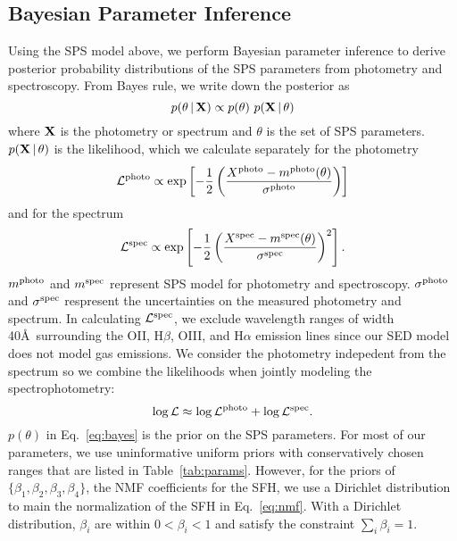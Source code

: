 \subsection{Bayesian Parameter Inference} \label{sec:infer} 
Using the SPS model above, we perform Bayesian parameter inference to derive
posterior probability distributions of the SPS parameters from photometry and
spectroscopy. 
From Bayes rule, we write down the posterior as
\begin{equation} \label{eq:bayes}
    p(\theta\given {\bf X}) \propto p(\theta)~p({\bf X} \given \theta)
\end{equation}
where ${\bf X}$ is the photometry or spectrum and $\theta$ is the set of SPS
parameters. 
$p({\bf X} \,|\, \theta)$ is the likelihood, which we calculate separately for
the photometry
\begin{equation}
    \mathcal{L}^{\rm photo} \propto \exp\left[-\frac{1}{2} \left(\frac{X^{\rm photo} -
    m^{\rm photo}(\theta)}{\sigma^{\rm photo}}\right)\right]
\end{equation}
and for the spectrum
\begin{equation}
    \mathcal{L}^{\rm spec} \propto \exp\left[-\frac{1}{2} \left(\frac{X^{\rm spec} -
    m^{\rm spec}(\theta)}{\sigma^{\rm spec}} \right)^2\right].
\end{equation}
$m^{\rm photo}$ and $m^{\rm spec}$ represent SPS model for photometry and
spectroscopy. 
$\sigma^{\rm photo}$ and $\sigma^{\rm spec}$ respresent the uncertainties on
the measured photometry and spectrum. 
In calculating $\mathcal{L}^{\rm spec}$, we exclude wavelength ranges of width
40\AA~surrounding the OII, H$\beta$, OIII, and H$\alpha$ emission lines since
our SED model does not model gas emissions.
We consider the photometry indepedent from the spectrum so we combine the
likelihoods when jointly modeling the spectrophotometry: 
\begin{equation}
    \log \mathcal{L} \approx \log \mathcal{L}^{\rm photo} + \log
    \mathcal{L}^{\rm spec}.
\end{equation}
$p(\theta)$ in Eq.~\ref{eq:bayes} is the prior on the SPS parameters. 
For most of our parameters, we use uninformative uniform priors with
conservatively chosen ranges that are listed in Table~\ref{tab:params}. 
However, for the priors of $\{\beta_1, \beta_2, \beta_3, \beta_4 \}$, the NMF coefficients
for the SFH, we use a Dirichlet distribution to main the normalization of the SFH in Eq.~\ref{eq:nmf}. 
With a Dirichlet distribution, $\beta_i$ are within $0 < \beta_i < 1$ and
satisfy the constraint $\sum_i \beta_i = 1$. 


